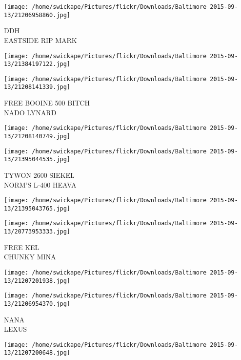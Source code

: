 \documentclass[10pt,letterpaper]{article}
\begin{document}
\vspace{0.25in}
\texttt{[image: /home/swickape/Pictures/flickr/Downloads/Baltimore 2015-09-13/21206958860.jpg]}

DDH\\
EASTSIDE RIP MARK\\
\pagebreak

\texttt{[image: /home/swickape/Pictures/flickr/Downloads/Baltimore 2015-09-13/21384197122.jpg]}

\vspace{0.25in}
\texttt{[image: /home/swickape/Pictures/flickr/Downloads/Baltimore 2015-09-13/21208141339.jpg]}

FREE BOOINE 500 BITCH\\
NADO LYNARD\\
\pagebreak

\texttt{[image: /home/swickape/Pictures/flickr/Downloads/Baltimore 2015-09-13/21208140749.jpg]}

\vspace{0.25in}
\texttt{[image: /home/swickape/Pictures/flickr/Downloads/Baltimore 2015-09-13/21395044535.jpg]}

TYWON 2600 SIEKEL\\
NORM'S L{-}400 HEAVA\\
\pagebreak

\texttt{[image: /home/swickape/Pictures/flickr/Downloads/Baltimore 2015-09-13/21395043765.jpg]}

\vspace{0.25in}
\texttt{[image: /home/swickape/Pictures/flickr/Downloads/Baltimore 2015-09-13/20773953333.jpg]}

FREE KEL\\
CHUNKY MINA\\
\pagebreak

\texttt{[image: /home/swickape/Pictures/flickr/Downloads/Baltimore 2015-09-13/21207201938.jpg]}

\vspace{0.25in}
\texttt{[image: /home/swickape/Pictures/flickr/Downloads/Baltimore 2015-09-13/21206954370.jpg]}

NANA\\
LEXUS\\
\pagebreak

\texttt{[image: /home/swickape/Pictures/flickr/Downloads/Baltimore 2015-09-13/21207200648.jpg]}
\end{document}
